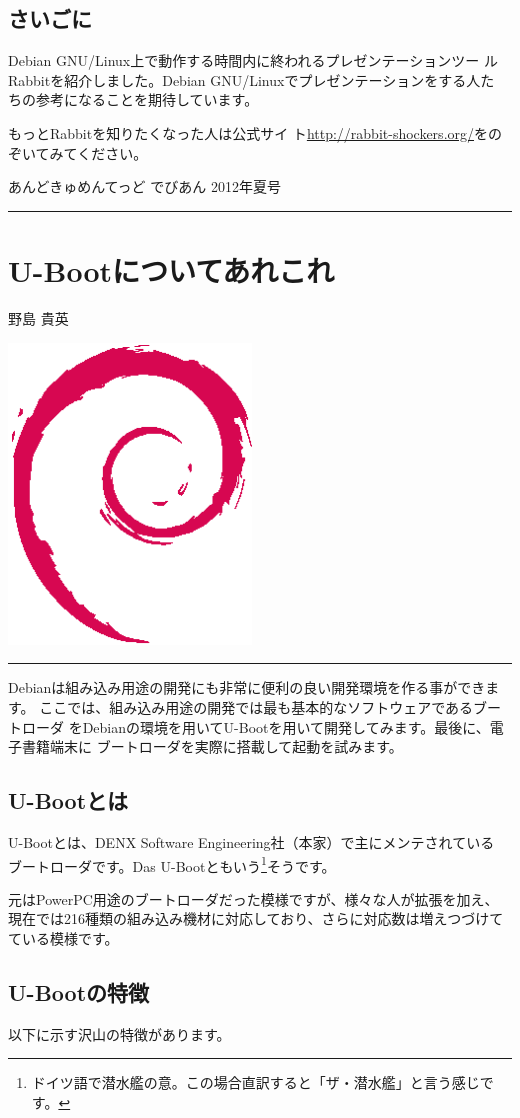 \documentclass[mingoth,a4paper]{jsarticle}
\renewcommand{\dancersection}[2]{%
\newpage
あんどきゅめんてっど でびあん 2012年夏号
%
\vspace{0.1mm}\\
{\color{dancerdarkblue}\rule{\hsize}{2mm}}

%
%
\begin{minipage}[t]{0.6\hsize}
\color{dancerdarkblue}
\vspace{1cm}
\section{#1}
\hfill{}#2\\
\end{minipage}
\begin{minipage}[t]{0.4\hsize}
\vspace{-2cm}
\hfill{}\includegraphics[height=8cm]{image200502/openlogo-nd.eps}\\
\vspace{-5cm}
\end{minipage}
%
{\color{dancerlightblue}\rule{0.66\hsize}{2mm}}
%
\vspace{2cm}
}
\begin{document}
\subsection{さいごに}

Debian GNU/Linux上で動作する時間内に終われるプレゼンテーションツー
ルRabbitを紹介しました。Debian GNU/Linuxでプレゼンテーションをする人た
ちの参考になることを期待しています。

もっとRabbitを知りたくなった人は公式サイ
ト\url{http://rabbit-shockers.org/}をのぞいてみてください。

\dancersection{U-Bootについてあれこれ}{野島 貴英}
\label{sec:u-boot-arekore}

\vspace{2em}

Debianは組み込み用途の開発にも非常に便利の良い開発環境を作る事ができます。
ここでは、組み込み用途の開発では最も基本的なソフトウェアであるブートローダ
をDebianの環境を用いてU-Bootを用いて開発してみます。最後に、電子書籍端末に
ブートローダを実際に搭載して起動を試みます。

\subsection{U-Bootとは}

U-Bootとは、DENX Software Engineering社（本家）で主にメンテされている
ブートローダです。Das U-Bootともいう\footnote{ドイツ語で潜水艦の意。この場合直訳すると「ザ・潜水艦」と言う感じです。}そうです。

元はPowerPC用途のブートローダだった模様ですが、様々な人が拡張を加え、現在では216種類の組み込み機材に対応しており、さらに対応数は増えつづけてている模様です\cite{u-boothistory}。

\subsection{U-Bootの特徴}

以下に示す沢山の特徴があります。
\end{document}
